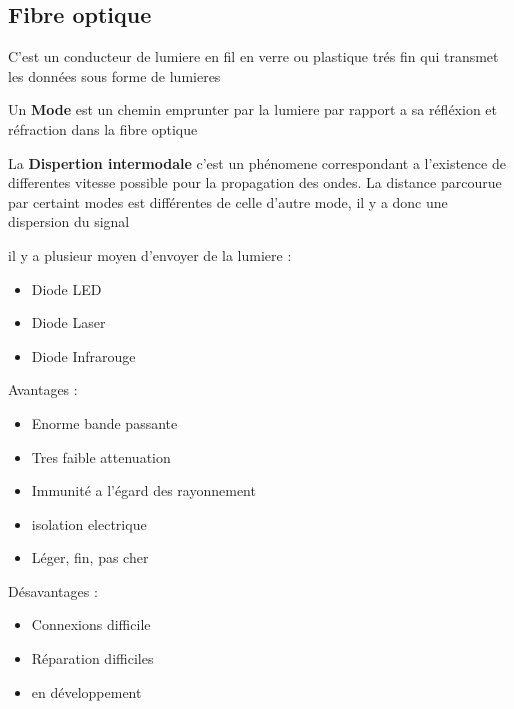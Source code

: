 	\subsection{Fibre optique}
		C'est un conducteur de lumiere en fil en verre ou plastique trés fin qui transmet les données sous forme de lumieres
		
		Un \textbf{Mode} est un chemin emprunter par la lumiere par rapport a sa réfléxion et réfraction dans la fibre optique
		
		La \textbf{Dispertion intermodale} c'est un phénomene correspondant a l'existence de differentes vitesse possible pour la propagation des ondes. La distance parcourue par certaint modes est différentes de celle d'autre mode, il y a donc une dispersion du signal
		
		il y a plusieur moyen d'envoyer de la lumiere :
		\begin{itemize}
			\item Diode LED
			\item Diode Laser
			\item Diode Infrarouge
		\end{itemize}
		
		Avantages :
		\begin{itemize}
			\item Enorme bande passante
			\item Tres faible attenuation
			\item Immunité a l'égard des rayonnement
			\item isolation electrique
			\item Léger, fin, pas cher
		\end{itemize}
		
		Désavantages :
		\begin{itemize}
			\item Connexions difficile
			\item Réparation difficiles
			\item en développement
		\end{itemize}
		

